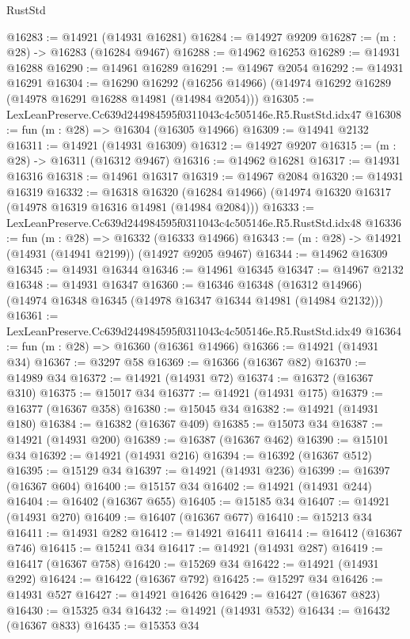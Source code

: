 \begin{lexlean}{RustStd}
\begin{coremodule}
@16283 := @14921 (@14931 @16281)
@16284 := @14927 @9209
@16287 := (m : @28) -> @16283 (@16284 @9467)
@16288 := @14962 @16253
@16289 := @14931 @16288
@16290 := @14961 @16289
@16291 := @14967 @2054
@16292 := @14931 @16291
@16304 := @16290
    @16292
    (@16256 @14966)
    (@14974 @16292 @16289 (@14978 @16291 @16288 @14981 (@14984 @2054)))
@16305 := LexLeanPreserve.Cc639d244984595f0311043c4c505146e.R5.RustStd.idx47
@16308 := fun (m : @28) => @16304 (@16305 @14966)
@16309 := @14941 @2132
@16311 := @14921 (@14931 @16309)
@16312 := @14927 @9207
@16315 := (m : @28) -> @16311 (@16312 @9467)
@16316 := @14962 @16281
@16317 := @14931 @16316
@16318 := @14961 @16317
@16319 := @14967 @2084
@16320 := @14931 @16319
@16332 := @16318
    @16320
    (@16284 @14966)
    (@14974 @16320 @16317 (@14978 @16319 @16316 @14981 (@14984 @2084)))
@16333 := LexLeanPreserve.Cc639d244984595f0311043c4c505146e.R5.RustStd.idx48
@16336 := fun (m : @28) => @16332 (@16333 @14966)
@16343 := (m : @28) -> @14921 (@14931 (@14941 @2199)) (@14927 @9205 @9467)
@16344 := @14962 @16309
@16345 := @14931 @16344
@16346 := @14961 @16345
@16347 := @14967 @2132
@16348 := @14931 @16347
@16360 := @16346
    @16348
    (@16312 @14966)
    (@14974 @16348 @16345 (@14978 @16347 @16344 @14981 (@14984 @2132)))
@16361 := LexLeanPreserve.Cc639d244984595f0311043c4c505146e.R5.RustStd.idx49
@16364 := fun (m : @28) => @16360 (@16361 @14966)
@16366 := @14921 (@14931 @34)
@16367 := @3297 @58
@16369 := @16366 (@16367 @82)
@16370 := @14989 @34
@16372 := @14921 (@14931 @72)
@16374 := @16372 (@16367 @310)
@16375 := @15017 @34
@16377 := @14921 (@14931 @175)
@16379 := @16377 (@16367 @358)
@16380 := @15045 @34
@16382 := @14921 (@14931 @180)
@16384 := @16382 (@16367 @409)
@16385 := @15073 @34
@16387 := @14921 (@14931 @200)
@16389 := @16387 (@16367 @462)
@16390 := @15101 @34
@16392 := @14921 (@14931 @216)
@16394 := @16392 (@16367 @512)
@16395 := @15129 @34
@16397 := @14921 (@14931 @236)
@16399 := @16397 (@16367 @604)
@16400 := @15157 @34
@16402 := @14921 (@14931 @244)
@16404 := @16402 (@16367 @655)
@16405 := @15185 @34
@16407 := @14921 (@14931 @270)
@16409 := @16407 (@16367 @677)
@16410 := @15213 @34
@16411 := @14931 @282
@16412 := @14921 @16411
@16414 := @16412 (@16367 @746)
@16415 := @15241 @34
@16417 := @14921 (@14931 @287)
@16419 := @16417 (@16367 @758)
@16420 := @15269 @34
@16422 := @14921 (@14931 @292)
@16424 := @16422 (@16367 @792)
@16425 := @15297 @34
@16426 := @14931 @527
@16427 := @14921 @16426
@16429 := @16427 (@16367 @823)
@16430 := @15325 @34
@16432 := @14921 (@14931 @532)
@16434 := @16432 (@16367 @833)
@16435 := @15353 @34

\end{coremodule}
\end{lexlean}
